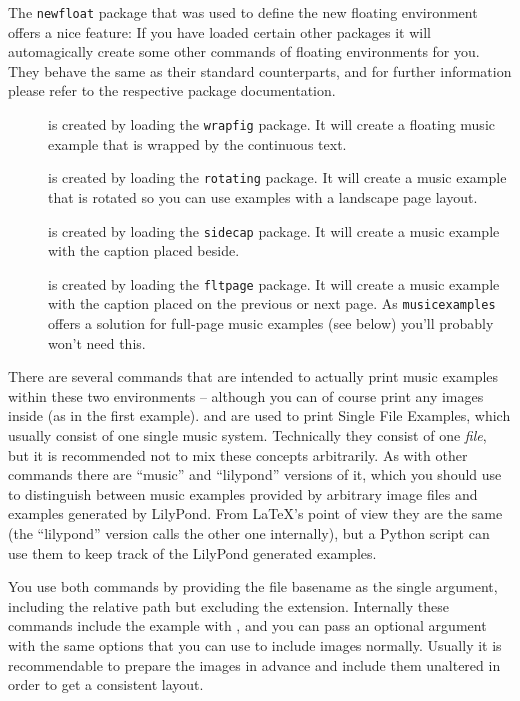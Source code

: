 \documentclass{OLLbook}
\begin{document}
The \texttt{newfloat} package that was used to define the new floating environment offers a nice feature:
If you have loaded certain other packages it will automagically create some other commands of floating environments for you.
They behave the same as their standard counterparts, and for further information please refer to the respective package documentation.

\begin{description}
\item[] is created by loading the \texttt{wrapfig} package.
It will create a floating music example that is wrapped by the continuous text.
\item[] is created by loading the \texttt{rotating} package.
It will create a music example that is rotated so you can use examples with a landscape page layout.
\item[] is created by loading the \texttt{sidecap} package.
It will create a music example with the caption placed beside.
\item[{}] is created by loading the \texttt{fltpage} package.
It will create a music example with the caption placed on the previous or next page.
As \texttt{musicexamples} offers a solution for full-page music examples (see below) you'll probably won't need this.
\end{description}

There are several commands that are intended to actually print music examples within these two environments -- although you can of course print any images inside (as in the first example).
 and  are used to print Single File Examples, which usually consist of one single music system.
Technically they consist of one \emph{file}, but it is recommended not to mix these concepts arbitrarily.
As with other commands there are “music” and “lilypond” versions of it, which  you should use to distinguish between music examples provided by arbitrary image files and examples generated by LilyPond.
From \LaTeX's point of view they are the same (the “lilypond” version calls the other one internally), but a Python script can use them to keep track of the LilyPond generated examples.

You use both commands by providing the file basename as the single argument, including the relative path but excluding the extension.
Internally these commands include the example with , and you can pass an optional argument with the same options that you can use to include images normally.
Usually it is recommendable to prepare the images in advance and include them unaltered in order to get a consistent layout.
\end{document}
